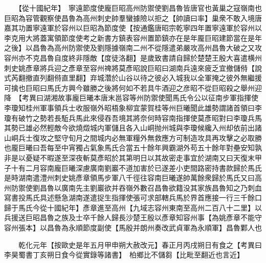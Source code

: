 　　【從十國紀年】　寧遠節度使龐巨昭高州防禦使劉昌魯皆唐官也黃巢之寇嶺南也巨昭為容管觀察使昌魯為高州刺史帥羣蠻據險以拒之【帥讀曰率】巢衆不敢入境唐嘉其功置寧遠軍於容州以巨昭為節度使【按通鑑唐昭宗乾寧四年置寧遠軍於容州以李克用大將蓋寓領節度使考之新書方鎮表容州置節鎮亦在是年龎巨昭建節當在是年之後】以昌魯為高州防禦使及劉隱據嶺南二州不從隱遣弟嚴攻高州昌魯大破之又攻容州亦不克昌魯自度終非隱敵【度徒洛翻】是歲致書請自歸於楚楚王殷大喜遣横州刺史姚彥章將兵迎之彥章至容州禆將莫彥昭說巨昭曰湖南兵遠來疲乏宜撤儲偫【說式芮翻撤直列翻偫直里翻】弃城濳於山谷以待之彼必入城我以全軍掩之彼外無繼援可擒也巨昭曰馬氏方興今雖勝之後將何如不若具牛酒迎之彦昭不從巨昭殺之舉州迎降　【考異曰湖湘故事龐巨曦本唐末邕容等州防禦使聞馬氏令公以征南步軍指揮使李瓊知桂州軍事領兵士收服嶺外昭梧象柳宜蒙賀桂等州巨曦聞此雄勢謂諸首領曰李瓊有破竹之勢若長駈兵馬此來侵吞吾境其將奈何時容南指揮使莫彥昭對曰李瓊兵馬其勢已雄必然輕敵今欲燒燬城内軍儲且各入山峒抛州城與李瓊候纔入州却依前出諸山峒兵士復攻之堅守旬月之間城内必無軍糧外無救應方可制造攻具再攻擊之必取勝也龎巨曦曰吾每至中宵獨占氣象馬氏合當五十餘年興霸湖外苟五十餘年對壘安知孰非是以憂疑不暇遂至深夜斬莫彥昭於其第明日以其故密走事宜於湖南又曰天復末甲子十有二月容南龐巨曦深慮廣南劉巖不道加害於已遂差小吏間路密持書款歸於馬氏是時湖南遣澧州刺史姚彥章領馬步軍八千徑往容南巨曦遂帥萬餘衆歸於馬氏又曰高州防禦使劉昌魯以廣南先主劉巖欲并吞嶺外數召昌魯欲籍没其家族昌魯知之乃刺血寫書投馬氏具述懸急湖南遂遣捉生指揮使張可求部轄兵馬於界首應接一行三千餘口歸于馬氏今從十國紀年】彥章進至高州【九域志容州東南至高州二百八十二里】以兵援送巨昭昌魯之族及士卒千餘人歸長沙楚王殷以彥章知容州事【為姚彥章不能守容州張本】以昌魯為永順節度副使【馬殷并朗州奏改武貞軍為永順軍】昌魯鄴人也

　　乾化元年【按歐史是年五月甲申朔大赦改元】春正月丙戌朔日有食之【考異曰李昊蜀書丁亥朔日食今從實錄等諸書】　柏鄉比不儲芻【比毗至翻近也言近】

